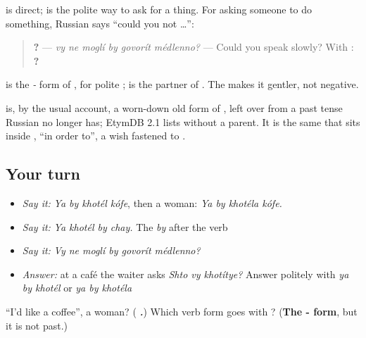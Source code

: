 \begin{grammarlens}[title={Grammar Lens: the polite request}]
\emph{ } is direct; \textbf{  } is the polite way to ask for a thing. For asking someone to do something, Russian says \textquotedblleft{}could you not …\textquotedblright{}:

\begin{quote}
\textbf{     ?} — \emph{vy ne moglí by govorít médlenno?} — Could you speak slowly? With \emph{}: \textbf{    ?}
\end{quote}

\textbf{} is the \emph{-} form of \emph{}, for polite \emph{}; \emph{} is the partner of \emph{}. The \textbf{} makes it gentler, not negative.
\end{grammarlens}

\begin{cousinweb}
\textbf{} is, by the usual account, a worn-down old form of \textbf{}, left over from a past tense Russian no longer has; EtymDB 2.1 lists \emph{} without a parent. It is the same \emph{} that sits inside \textbf{}, \textquotedblleft{}in order to\textquotedblright{}, a wish fastened to \emph{}.
\end{cousinweb}

\subsection*{Your turn}
\begin{itemize}
\raggedright
  \item \emph{Say it:} \emph{Ya by khotél kófe}, then a woman: \emph{Ya by khotéla kófe.}
  \item \emph{Say it:} \emph{Ya khotél by chay.} The \emph{by} after the verb
  \item \emph{Say it:} \emph{Vy ne moglí by govorít médlenno?}
  \item \emph{Answer:} at a café the waiter asks \emph{Shto vy khotítye?} Answer politely with \emph{ya by khotél} or \emph{ya by khotéla}
\end{itemize}

\begin{tcolorbox}[breakable,colback=teal!4,colframe=teal!35!black,title={Before you move on}]
\textquotedblleft{}I'd like a coffee\textquotedblright{}, a woman? (\emph{\textbf{   .}}) Which verb form goes with \emph{}? (\textbf{The - form}, but it is not past.)
\end{tcolorbox}
